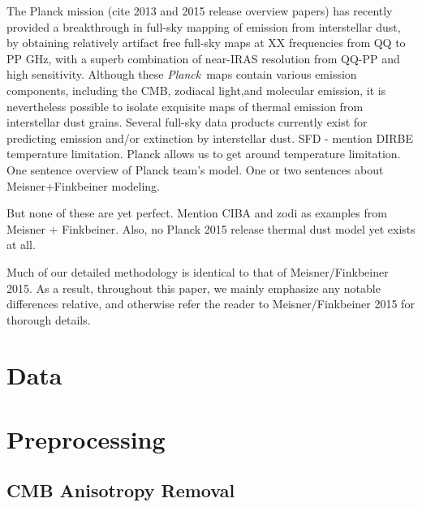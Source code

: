 \documentclass{emulateapj}
\newcommand{\PLANCK}{{\it Planck}}
\begin{document}
The Planck mission (cite 2013 and 2015 release overview papers) has recently 
provided a breakthrough in full-sky mapping of emission from interstellar dust,
by obtaining relatively artifact free full-sky maps at XX frequencies from QQ 
to PP GHz, with a superb combination of near-IRAS resolution from QQ-PP and 
high sensitivity. Although these \PLANCK~maps contain various emission 
components, including the CMB, zodiacal light,and molecular emission, it is 
nevertheless possible to isolate exquisite maps of thermal emission from 
interstellar dust grains.
Several full-sky data products currently exist for predicting emission and/or
extinction by interstellar dust. SFD - mention DIRBE temperature limitation.
Planck allows us to get around temperature limitation. One sentence overview of
Planck team's model. One or two sentences about Meisner+Finkbeiner modeling.

But none of these are yet perfect. Mention CIBA and zodi as examples from
Meisner + Finkbeiner. Also, no Planck 2015 release thermal dust model yet
exists at all.

Much of our detailed methodology is identical to that of Meisner/Finkbeiner 
2015. As a result, throughout this paper, we mainly emphasize any notable 
differences relative, and otherwise refer the reader to Meisner/Finkbeiner 
2015 for thorough details.

\section{Data}
\label{sec:data}

\section{Preprocessing}
\label{sec:prepro}

\subsection{CMB Anisotropy Removal}
\label{sec:cmb}
\end{document}
